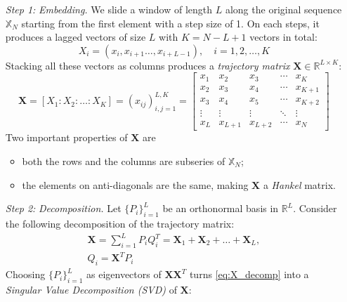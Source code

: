 \begin{itemize}
	\setlength{\itemindent}{2em}
	\item[\textit{Step 1:}] \textit{Embedding.} We slide a window of length $L$ 
	along the original sequence $\mathbb{X}_N$ starting from the first element 
	with a step size of 1. On each steps, it produces a lagged vectors of size
	$L$ with $K=N-L+1$ vectors in total:
	\begin{equation}
		X_i=(x_i,x_{i+1}\ldots,x_{i+L-1}),\quad i=1,2,\ldots,K
		\label{eq:X_i}
	\end{equation}
	Stacking all these vectors as columns produces a \textit{trajectory matrix}
	$\mathbf{X}\in\mathbb{R}^{L\times K}$:
	\begin{equation}
		\mathbf{X}=[X_1:X_2:\ldots:X_K]=(x_{ij})_{i,j=1}^{L,K}=
		\begin{bmatrix}
			x_1 & x_2 & x_3 & \cdots & x_K \\
			x_2 & x_3 & x_4 & \cdots & x_{K+1} \\
			x_3 & x_4 & x_5 & \cdots & x_{K+2} \\
			\vdots & \vdots & \vdots & \ddots & \vdots \\
			x_L & x_{L+1} & x_{L+2} & \cdots & x_N
		\end{bmatrix}
		\label{eq:X_embed}
	\end{equation}
	Two important properties of $\mathbf{X}$ are
	\begin{itemize}
		\item both the rows and the columns are subseries of $\mathbb{X}_N$;
		\item the elements on anti-diagonals are the same, making $\mathbf{X}$ a
		\textit{Hankel} matrix.
	\end{itemize}
	\item[\textit{Step 2:}] \textit{Decomposition.} Let $\{P_i\}_{i=1}^L$ be an
	orthonormal basis in $\mathbb{R}^L$. Consider the following decomposition of
	the trajectory matrix:
	\begin{equation}
		\begin{gathered}
			\mathbf{X}=\sum_{i=1}^LP_iQ_i^T=\mathbf{X}_1+\mathbf{X}_2+\ldots+\mathbf{X}_L,\\
			Q_i=\mathbf{X}^TP_i
		\end{gathered}
		\label{eq:X_decomp}
	\end{equation}
	Choosing $\{P_i\}_{i=1}^L$ as eigenvectors of $\mathbf{X}\mathbf{X}^T$ turns
	\ref{eq:X_decomp} into a  \textit{Singular Value Decomposition (SVD)} of 
	$\mathbf{X}$:
	\begin{equation}

\end{equation}
\end{itemize}
